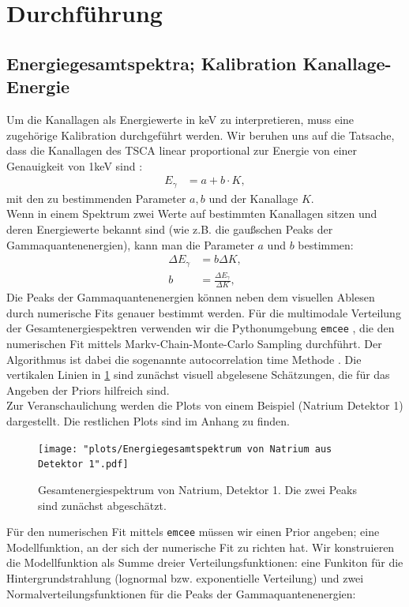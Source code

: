\documentclass[%
aps,
onecolumn,
11pt,
tightenlines,
nofootinbib,
superscriptaddress,
floatfix,
prd,
]{revtex4-2}
\begin{document}
\section{Durchführung}
\label{sec:Durchführung und Resultate}
\subsection{Energiegesamtspektra; Kalibration Kanallage-Energie}
Um die Kanallagen als Energiewerte in keV zu interpretieren, muss eine zugehörige Kalibration durchgeführt werden. Wir beruhen uns auf die Tatsache, dass die Kanallagen des TSCA linear proportional zur Energie von einer Genauigkeit von 1keV sind \cite{manualold}:
\begin{align}
	E_{\gamma} &= a + b\cdot K,
	\label{eq:calibrate}
\end{align}
mit den zu bestimmenden Parameter $a,b$ und der Kanallage $K$. \\
Wenn in einem Spektrum zwei Werte auf bestimmten Kanallagen sitzen und deren Energiewerte bekannt sind (wie z.B. die gaußschen Peaks der Gammaquantenenergien), kann man die Parameter $a$ und $b$ bestimmen:
\begin{align}
	\Delta E_{\gamma} &= b \Delta K , \\
	b &= \frac{\Delta E_{\gamma}}{\Delta K},
\end{align}
Die Peaks der Gammaquantenenergien können neben dem visuellen Ablesen durch numerische Fits genauer bestimmt werden. Für die multimodale Verteilung der Gesamtenergiespektren verwenden wir die Pythonumgebung \texttt{emcee} \cite{Foreman_Mackey_2013}, die den numerischen Fit mittels Markv-Chain-Monte-Carlo Sampling durchführt. Der Algorithmus ist dabei die sogenannte autocorrelation time Methode \cite{Foreman_Mackey_2013}. Die vertikalen Linien in \ref{fig:so1initial} sind zunächst visuell abgelesene Schätzungen, die für das Angeben der Priors hilfreich sind.\\
Zur Veranschaulichung werden die Plots von einem Beispiel (Natrium Detektor 1) dargestellt. Die restlichen Plots sind im Anhang zu finden.
\begin{figure}[H]
		\centering
		\texttt{[image: "plots/Energiegesamtspektrum von Natrium aus Detektor 1".pdf]}
		\caption{Gesamtenergiespektrum von Natrium, Detektor 1.
		Die zwei Peaks sind zunächst abgeschätzt.}
		\label{fig:so1initial}
\end{figure}
Für den numerischen Fit mittels \texttt{emcee} müssen wir einen Prior angeben; eine Modellfunktion, an der sich der numerische Fit zu richten hat. Wir konstruieren die Modellfunktion als Summe dreier Verteilungsfunktionen: eine Funkiton für die Hintergrundstrahlung (lognormal bzw. exponentielle Verteilung) und zwei Normalverteilungsfunktionen für die Peaks der Gammaquantenenergien:
\end{document}
